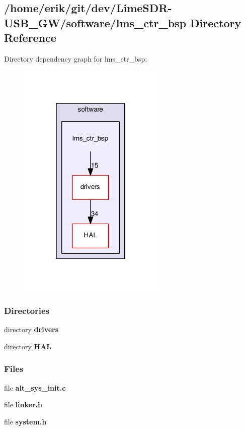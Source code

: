 \subsection{/home/erik/git/dev/\+Lime\+S\+D\+R-\/\+U\+S\+B\+\_\+\+G\+W/software/lms\+\_\+ctr\+\_\+bsp Directory Reference}
\label{dir_cacc84abd47b879fedbb46a62e83a9a1}
Directory dependency graph for lms\+\_\+ctr\+\_\+bsp\+:
\nopagebreak
\begin{figure}[H]
\begin{center}
\leavevmode
\includegraphics[width=198pt]{dir_cacc84abd47b879fedbb46a62e83a9a1_dep}
\end{center}
\end{figure}
\subsubsection*{Directories}
\begin{DoxyCompactItemize}
\item 
directory {\bf drivers}
\item 
directory {\bf H\+AL}
\end{DoxyCompactItemize}
\subsubsection*{Files}
\begin{DoxyCompactItemize}
\item 
file {\bf alt\+\_\+sys\+\_\+init.\+c}
\item 
file {\bf linker.\+h}
\item 
file {\bf system.\+h}
\end{DoxyCompactItemize}
